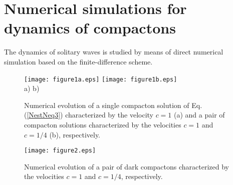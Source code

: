 \documentclass[12pt]{article}
\begin{document}
\section{Numerical simulations for dynamics of compactons}\label{vs:sec4}



The dynamics of  solitary waves is studied by means of
direct numerical simulation based on the finite-difference scheme.

\begin{figure}[h]
\begin{center}
\texttt{[image: figure1a.eps]}\hspace{0.5cm}
\texttt{[image: figure1b.eps]}\\
a) \hspace{6cm} b)\\
\end{center}
\caption{
Numerical evolution of a single compacton solution of  Eq. (\ref{NestNeq3}) characterized by the velocity
$c=1$  (a)
 and
a pair of  compacton solutions characterized by the velocities $c=1$ and  $c=1/4$ (b), respectively.
}\label{fig:1}
\end{figure}


\begin{figure}
\begin{center}
\texttt{[image: figure2.eps]}
\end{center}
\caption{Numerical evolution of a pair of  dark compactons   characterized by the velocities $c=1$ and $c=1/4$, respectively.}\label{fig:2}
\end{figure}
\end{document}
